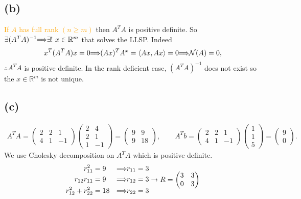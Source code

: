 \documentclass[12pt]{article}
\newcommand{\la}{\langle} \newcommand{\ra}{\rangle}
\let\oldimplies\implies
\renewcommand*{\implies}{
	\hspace{-0.05cm}\resizebox{.95\width}{\height}{$\oldimplies$}\hspace{-0.05cm}
}
\begin{document}
		\subsection*{(b)}
			\textcolor{orange}{If $A$ has full rank $(n \ge m)$} then $A^{T}A$ is positive definite. So $\exists (A^{T}A)^{-1} \implies \exists ! \ x \in \mathbb{R}^{m}$ that solves the LLSP. Indeed 
			$$ x^{T}(A^{T}A)x = 0 \implies (Ax)^{T} A^{x} = \la Ax, Ax \ra =0 \implies \mathcal{N}(A)=0,$$
			$\therefore A^{T}A$ is positive definite. In the rank deficient case, $(A^{T}A)^{-1}$ does not exist so the $x \in \mathbb{R}^{m}$ is not unique.
		\subsection*{(c)}
			\begin{gather*}
				A^{T}A = \begin{pmatrix}
					2 & 2& 1 \\ 4 & 1 & -1
				\end{pmatrix} \begin{pmatrix}
					2 &4 \\ 2 & 1 \\ 1 & -1
				\end{pmatrix} = \begin{pmatrix}
					9 & 9  \\ 9 & 18
				\end{pmatrix}, \qquad A^{T}b = \begin{pmatrix}
					2 & 2 &1 \\ 4 & 1 & -1
				\end{pmatrix} \begin{pmatrix}
					1 \\ 1 \\ 5
				\end{pmatrix} = \begin{pmatrix}
					9 \\ 0
				\end{pmatrix}.
			\end{gather*}
			We use Cholesky decomposition on $A^{T}A$ which is positive definite.
			\[ \begin{align}
				r_{11}^{2} &=9 &\implies  r_{11} &= 3\\
				r_{12}r_{11} &= 9 &\implies r_{12} &= 3\\
				r_{12}^{2} + r_{22}^{2} &= 18 &\implies r_{22} &= 3
			\end{align} \xrightarrow{} R = \begin{pmatrix}
				3 & 3 \\ 0 & 3
			\end{pmatrix}
			\]
\end{document}
